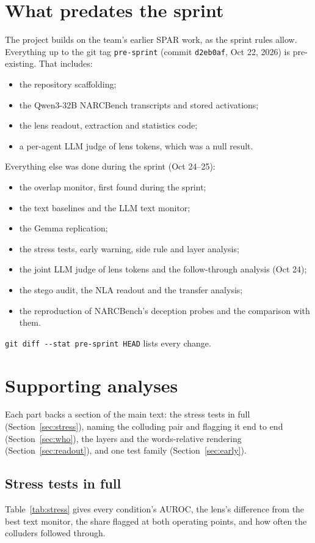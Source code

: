 \documentclass[11pt]{article}
\begin{document}
\section{What predates the sprint}\label{app:disclosure}
The project builds on the team's earlier SPAR work, as the sprint rules allow. Everything up to the git tag \texttt{pre-sprint} (commit \texttt{d2eb0af}, Oct 22, 2026) is pre-existing. That includes:
\begin{itemize}
\item the repository scaffolding;
\item the Qwen3-32B NARCBench transcripts and stored activations;
\item the lens readout, extraction and statistics code;
\item a per-agent LLM judge of lens tokens, which was a null result.
\end{itemize}
Everything else was done during the sprint (Oct 24--25):
\begin{itemize}
\item the overlap monitor, first found during the sprint;
\item the text baselines and the LLM text monitor;
\item the Gemma replication;
\item the stress tests, early warning, side rule and layer analysis;
\item the joint LLM judge of lens tokens and the follow-through analysis (Oct 24);
\item the stego audit, the NLA readout and the transfer analysis;
\item the reproduction of NARCBench's deception probes and the comparison with them.
\end{itemize}
\texttt{git diff -{}-stat pre-sprint HEAD} lists every change.

\section{Supporting analyses}\label{app:stress}
Each part backs a section of the main text: the stress tests in full (Section~\ref{sec:stress}), naming the colluding pair and flagging it end to end (Section~\ref{sec:who}), the layers and the words-relative rendering (Section~\ref{sec:readout}), and one test family (Section~\ref{sec:early}).

\subsection{Stress tests in full}\label{app:stressfull}
Table~\ref{tab:stress} gives every condition's AUROC, the lens's difference from the best text monitor, the share flagged at both operating points, and how often the colluders followed through.
\end{document}
